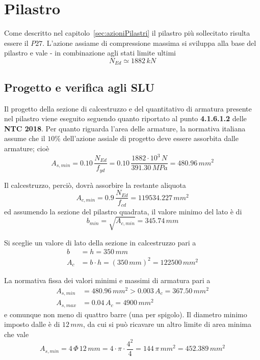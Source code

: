 \chapter{Pilastro}\label{chap:pilastro}
Come descritto nel capitolo~\ref{sec:azioniPilastri} il pilastro più sollecitato risulta essere il $P27$. L'azione assiame di compressione massima si sviluppa alla base del pilastro e vale - in combinazione agli stati limite ultimi
\begin{equation}
    \label{eq:NEd_slu}
	N_{Ed} \simeq 1882\,kN
\end{equation}

\section{Progetto e verifica agli SLU}
Il progetto della sezione di calcestruzzo e del quantitativo di armatura presente nel pilastro viene eseguito seguendo quanto riportato al punto \textbf{4.1.6.1.2} delle \textbf{NTC 2018}. Per quanto riguarda l'area delle armature, la normativa italiana assume che il $10\%$ dell'azione assiale di progetto deve essere assorbita dalle armature; cioè
\begin{equation}
    \label{eq:Asmin}
	A_{s,min} = 0.10\,\dfrac{N_{Ed}}{f_{yd}} = 0.10\,\dfrac{1882\cdot 10^3\,N}{391.30\,MPa} = 480.96\,mm^2
\end{equation}

Il calcestruzzo, perciò, dovrà assorbire la restante aliquota
\begin{equation}
    \label{Acmin}
	A_{c,min} = 0.9\,\dfrac{N_{Ed}}{f_{cd}} = 119534.227\,mm^2
\end{equation}
ed assumendo la sezione del pilastro quadrata, il valore minimo del lato è di 
\begin{equation}
    \label{eq:lmin}
	b_{min} = \sqrt{A_{c,min}} = 345.74\,mm
\end{equation}

Si sceglie un valore di lato della sezione in calcestruzzo pari a 
\begin{align}
    \label{eq:l}
	b &= h = 350\,mm\\
	A_c &= b\cdot h = (350\,mm)^2 = 122500\,mm^2	
\end{align}

La normativa fissa dei valori minimi e massimi di armatura pari a 
\begin{align*}
	A_{s,min} &= 480.96\,mm^2 > 0.003\,A_c = 367.50\,mm^2\\
	A_{s,max} &= 0.04\,A_c = 4900\,mm^2
\end{align*}
e comunque non meno di quattro barre (una per spigolo). Il diametro minimo imposto dalle \ntc è di $12\,mm$, da cui si può ricavare un altro limite di area minima che vale
\[
A_{s, min} = 4\,\Phi\,12\,mm = 4\cdot\pi\cdot\dfrac{4^2}{4} = 144\,\pi\,mm^2 = 452.389\,mm^2
\]

